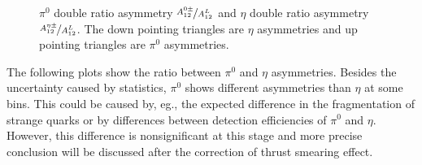 \begin{figure}[H]
  \caption{$\pi^0$ double ratio asymmetry $\nicefrac{A^{0\pm}_{12}}{A^L_{12}}$ and $\eta$ double ratio asymmetry $\nicefrac{A^{\eta\pm}_{12}}{A^L_{12}}$. The down pointing triangles are $\eta$ asymmetries and up pointing triangles are $\pi^0$ asymmetries.}
  \label{fig:exp_pi0_eta_result}
\end{figure}
The following plots show the ratio between $\pi^0$ and $\eta$ asymmetries. Besides the uncertainty caused by statistics, $\pi^0$ shows different asymmetries than $\eta$ at some bins. This could be caused by, eg., the expected difference in the fragmentation of strange quarks or by differences between detection efficiencies of $\pi^0$ and $\eta$. However, this difference is nonsignificant at this stage and more precise conclusion will be discussed after the correction of thrust smearing effect.
